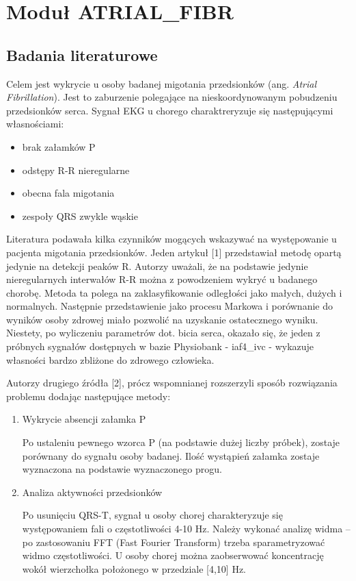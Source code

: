 \section{Moduł ATRIAL\_FIBR}
\subsection{Badania literaturowe}
Celem jest wykrycie u osoby badanej migotania przedsionków (ang. \textit{Atrial Fibrillation}). 
Jest to zaburzenie polegające na nieskoordynowanym pobudzeniu przedsionków serca. 
Sygnał EKG u chorego charaktreryzuje się następującymi własnościami:
\begin{itemize}
  \item brak załamków P
  \item odstępy R-R nieregularne
  \item obecna fala migotania
  \item zespoły QRS zwykle wąskie
\end{itemize}

Literatura podawała kilka czynników mogących wskazywać na występowanie u pacjenta migotania przedsionków. 
Jeden artykuł [1] przedstawiał metodę opartą jedynie na detekcji peaków R. 
Autorzy uważali, że na podstawie jedynie nieregularnych interwałów R-R 
można z powodzeniem wykryć u badanego chorobę. 
Metoda ta polega na zaklasyfikowanie odległości jako małych, dużych i normalnych. 
Następnie przedstawienie jako procesu Markowa i porównanie do wyników osoby zdrowej miało pozwolić 
na uzyskanie ostatecznego wyniku.
Niestety, po wyliczeniu parametrów dot. bicia serca, 
okazało się, że jeden z próbnych sygnałów dostępnych w bazie Physiobank - 
iaf4\_ivc - wykazuje własności bardzo zbliżone do zdrowego człowieka.

Autorzy drugiego źródła [2], prócz wspomnianej rozszerzyli sposób rozwiązania problemu dodając następujące metody:
\begin{enumerate}
 \item Wykrycie absencji załamka P
 
    Po ustaleniu pewnego wzorca  P (na podstawie dużej liczby próbek), 
    zostaje porównany do sygnału osoby badanej. 
    Ilość wystąpień załamka zostaje wyznaczona na podstawie wyznaczonego progu.
 \item Analiza aktywności przedsionków
 
    Po usunięciu QRS-T, sygnał u osoby chorej charakteryzuje się występowaniem fali o częstotliwości 4-10 Hz. 
    Należy wykonać analizę widma -- po zastosowaniu FFT (Fast Fourier Transform) 
    trzeba sparametryzować widmo częstotliwości.  
    U osoby chorej można zaobserwować koncentrację wokół wierzchołka położonego w przedziale [4,10] Hz.
\end{enumerate}

